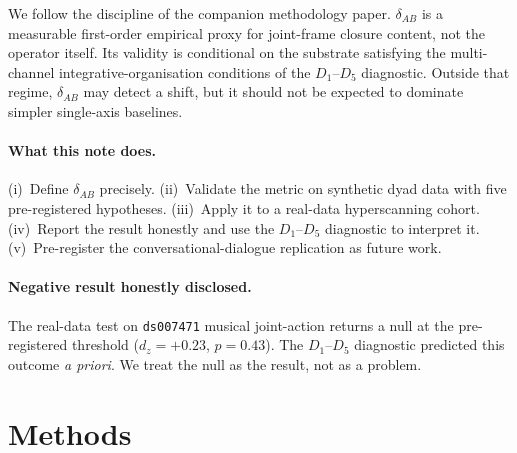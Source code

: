 \documentclass[11pt,a4paper]{article}
\begin{document}
\bigskip
\noindent{}
\bigskip

We follow the discipline of the companion methodology paper. $\delta_{AB}$ is a measurable first-order empirical proxy for joint-frame closure content, not the operator itself. Its validity is conditional on the substrate satisfying the multi-channel integrative-organisation conditions of the $D_1$--$D_5$ diagnostic. Outside that regime, $\delta_{AB}$ may detect a shift, but it should not be expected to dominate simpler single-axis baselines.

\paragraph{What this note does.} (i)~Define $\delta_{AB}$ precisely. (ii)~Validate the metric on synthetic dyad data with five pre-registered hypotheses. (iii)~Apply it to a real-data hyperscanning cohort. (iv)~Report the result honestly and use the $D_1$--$D_5$ diagnostic to interpret it. (v)~Pre-register the conversational-dialogue replication as future work.

\paragraph{Negative result honestly disclosed.} The real-data test on \texttt{ds007471} musical joint-action returns a null at the pre-registered threshold ($d_z = +0.23$, $p = 0.43$). The $D_1$--$D_5$ diagnostic predicted this outcome \emph{a priori}. We treat the null as the result, not as a problem.

\section{Methods}\label{sec:methods}
\end{document}
